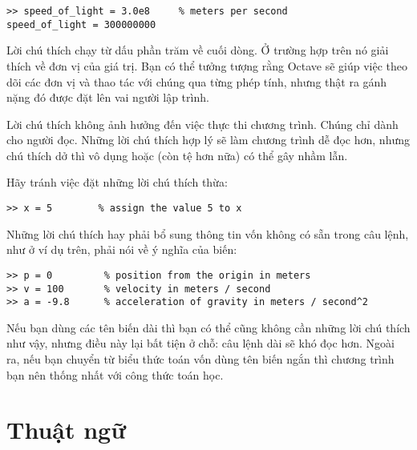 \documentclass[12pt]{book}
\begin{document}
\begin{verbatim}
>> speed_of_light = 3.0e8     % meters per second
speed_of_light = 300000000
\end{verbatim}
%
Lời chú thích chạy từ dấu phần trăm về cuối dòng. Ở trường hợp trên
nó giải thích về đơn vị của giá trị. Bạn có thể tưởng tượng rằng Octave
sẽ giúp việc theo dõi các đơn vị và thao tác với chúng qua từng phép tính,
nhưng thật ra gánh nặng đó được đặt lên vai người lập trình.

Lời chú thích không ảnh hưởng đến việc thực thi chương trình. Chúng
chỉ dành cho người đọc. Những lời chú thích hợp lý sẽ làm chương trình
dễ đọc hơn, nhưng chú thích dở thì vô dụng hoặc (còn tệ hơn nữa)
có thể gây nhầm lẫn.

Hãy tránh việc đặt những lời chú thích thừa:

\begin{verbatim}
>> x = 5        % assign the value 5 to x
\end{verbatim}
%
Những lời chú thích hay phải bổ sung thông tin vốn không có sẵn trong
câu lệnh, như ở ví dụ trên, phải nói về ý nghĩa của biến:

\begin{verbatim}
>> p = 0         % position from the origin in meters 
>> v = 100       % velocity in meters / second
>> a = -9.8      % acceleration of gravity in meters / second^2
\end{verbatim}
%
Nếu bạn dùng các tên biến dài thì bạn có thể cũng không cần những
lời chú thích như vậy, nhưng điều này lại bất tiện ở chỗ: câu lệnh dài
sẽ khó đọc hơn. Ngoài ra, nếu bạn chuyển từ biểu thức toán vốn 
dùng tên biến ngắn thì chương trình bạn nên thống nhất với công
thức toán học.

\section{Thuật ngữ}
\end{document}
